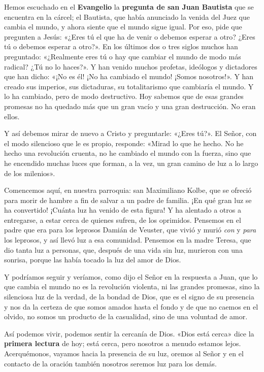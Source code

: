 \documentclass[]{article}
\begin{document}
Hemos escuchado en el \textbf{Evangelio} la \textbf{pregunta de san Juan
Bautista} que se encuentra en la cárcel; el Bautista, que había
anunciado la venida del Juez que cambia el mundo, y ahora siente que el
mundo sigue igual. Por eso, pide que pregunten a Jesús: «¿Eres tú el que
ha de venir o debemos esperar a otro? ¿Eres tú o debemos esperar a
otro?». En los últimos dos o tres siglos muchos han preguntado:
«¿Realmente eres tú o hay que cambiar el mundo de modo más radical? ¿Tú
no lo haces?». Y han venido muchos profetas, ideólogos y dictadores que
han dicho: «¡No es él! ¡No ha cambiado el mundo! ¡Somos nosotros!». Y
han creado sus imperios, sus dictaduras, su totalitarismo que cambiaría
el mundo. Y lo ha cambiado, pero de modo destructivo. Hoy sabemos que de
esas grandes promesas no ha quedado más que un gran vacío y una gran
destrucción. No eran ellos.

Y así debemos mirar de nuevo a Cristo y preguntarle: «¿Eres tú?». El
Señor, con el modo silencioso que le es propio, responde: «Mirad lo que
he hecho. No he hecho una revolución cruenta, no he cambiado el mundo
con la fuerza, sino que he encendido muchas luces que forman, a la vez,
un gran camino de luz a lo largo de los milenios».

Comencemos aquí, en nuestra parroquia: san Maximiliano Kolbe, que se
ofreció para morir de hambre a fin de salvar a un padre de familia. ¡En
qué gran luz se ha convertido! ¡Cuánta luz ha venido de esta figura! Y
ha alentado a otros a entregarse, a estar cerca de quienes sufren, de
los oprimidos. Pensemos en el padre que era para los leprosos Damián de
Veuster, que vivió y murió \emph{con} y \emph{para} los leprosos, y así
llevó luz a esa comunidad. Pensemos en la madre Teresa, que dio tanta
luz a personas, que, después de una vida sin luz, murieron con una
sonrisa, porque las había tocado la luz del amor de Dios.

Y podríamos seguir y veríamos, como dijo el Señor en la respuesta a
Juan, que lo que cambia el mundo no es la revolución violenta, ni las
grandes promesas, sino la silenciosa luz de la verdad, de la bondad de
Dios, que es el signo de su presencia y nos da la certeza de que somos
amados hasta el fondo y de que no caemos en el olvido, no somos un
producto de la casualidad, sino de una voluntad de amor.

Así podemos vivir, podemos sentir la cercanía de Dios. «Dios está cerca»
dice la \textbf{primera lectura} de hoy; está cerca, pero nosotros a
menudo estamos lejos. Acerquémonos, vayamos hacia la presencia de su
luz, oremos al Señor y en el contacto de la oración también nosotros
seremos luz para los demás.
\end{document}
